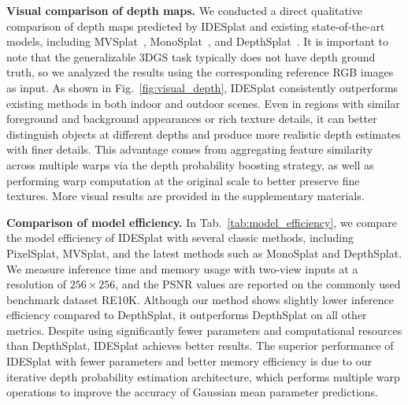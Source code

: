 %
\noindent\textbf{Visual comparison of depth maps.}
We conducted a direct qualitative comparison of depth maps predicted by IDESplat and existing state-of-the-art models, including MVSplat~\cite{chen2024mvsplat}, MonoSplat~\cite{liu2025monosplat}, and DepthSplat~\cite{xu2025depthsplat}. It is important to note that the generalizable 3DGS task typically does not have depth ground truth, so we analyzed the results using the corresponding reference RGB images as input. 
%
As shown in Fig.~\ref{fig:visual_depth}, IDESplat consistently outperforms existing methods in both indoor and outdoor scenes.
%
Even in regions with similar foreground and background appearances or rich texture details, it can better distinguish objects at different depths and produce more realistic depth estimates with finer details.
%
This advantage comes from aggregating feature similarity across multiple warps via the depth probability boosting strategy, as well as performing warp computation at the original scale to better preserve fine textures. 
%
More visual results are provided in the supplementary materials.


\noindent\textbf{Comparison of model efficiency.}
In Tab.~\ref{tab:model_efficiency}, we compare the model efficiency of IDESplat with several classic methods, including PixelSplat, MVSplat, and the latest methods such as MonoSplat and DepthSplat. We measure inference time and memory usage with two-view inputs at a resolution of $256 \times 256$, and the PSNR values are reported on the commonly used benchmark dataset RE10K. Although our method shows slightly lower inference efficiency compared to DepthSplat, it outperforms DepthSplat on all other metrics. Despite using significantly fewer parameters and computational resources than DepthSplat, IDESplat achieves better results. The superior performance of IDESplat with fewer parameters and better memory efficiency is due to our iterative depth probability estimation architecture, which performs multiple warp operations to improve the accuracy of Gaussian mean parameter predictions.



